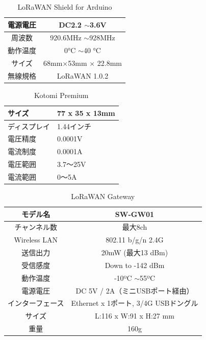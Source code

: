 \begin{table}[]
    \caption{LoRaWAN Shield for Arduino}\label{fig:LoRaWAN_Spec}
    \centering
    \begin{tabular}{|c|c|}
    \hline
    電源電圧 & DC2.2 $\sim$3.6V      \\ \hline
    周波数  & 920.6MHz $\sim$928MHz \\ \hline
    動作温度 & 0°C $\sim$40 °C       \\ \hline
    サイズ  & 68mm×53mm × 22.8mm    \\ \hline
    無線規格 & LoRaWAN 1.0.2         \\ \hline
    \end{tabular}
\end{table}

\begin{table}[]
    \caption{Kotomi Premium}\label{fig:Kotomi_Spec}
    \centering
    \begin{tabular}{|l|l|}
    \hline
    サイズ    & 77 x 35 x 13mm \\ \hline
    ディスプレイ & 1.44インチ        \\ \hline
    電圧精度   & 0.0001V        \\ \hline
    電流制度   & 0.0001A        \\ \hline
    電圧範囲   & 3.7～25V        \\ \hline
    電流範囲   & 0～5A           \\ \hline
    \end{tabular}
\end{table}

\begin{table}[]
    \caption{LoRaWAN Gateway}\label{fig:LoRaWAN_Gateway_Spec}
    \centering
    \begin{tabular}{|c|c|}
    \hline
    モデル名         & SW-GW01                       \\ \hline
    チャンネル数       & 最大8ch                         \\ \hline
    Wireless LAN & 802.11 b/g/n 2.4G             \\ \hline
    送信出力         & 20mW (最大13 dBm)               \\ \hline
    受信感度         & Down to -142 dBm              \\ \hline
    動作温度         & -10ºC $\sim$55ºC              \\ \hline
    電源電圧         & DC 5V / 2A（ミニUSBポート経由）        \\ \hline
    インターフェース     & Ethernet x 1ポート, 3/4G USBドングル \\ \hline
    サイズ          & L:116 x W:91 x H:27 mm        \\ \hline
    重量           & 160g                          \\ \hline
    \end{tabular}
\end{table}

